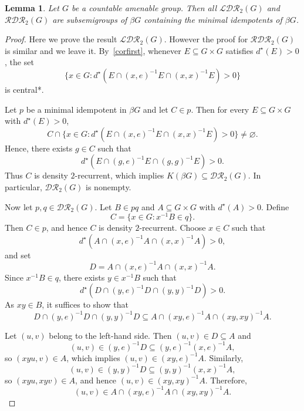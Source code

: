 \documentclass[10pt,a4paper]{amsart}
\newtheorem{lem}{Lemma}
\begin{document}
\begin{lem}\label{subsemigroup}
Let $G$ be a countable amenable group. Then all $ \mathcal{LDR}_2(G)$ and $\mathcal{RDR}_2(G)$ are subsemigroups of $\beta G$ containing the minimal idempotents of $\beta G$.
\end{lem}

\begin{proof} Here we prove the result $\mathcal{LDR}_2(G).$ However the proof for  $\mathcal{RDR}_2(G)$ is similar and we leave it.
By~\ref{corfirst}, whenever
$E \subseteq G \times G$ satisfies $d^\star(E) > 0$, the set
\[
\{ x \in G : d^\star(E \cap (x,e)^{-1}E \cap (x,x)^{-1}E) > 0 \}
\]
is central*.

Let $p$ be a minimal idempotent in $\beta G$ and let $C \in p$. Then for every
$E \subseteq G \times G$ with $d^\star(E) > 0$,
\[
C \cap \{ x \in G : d^\star(E \cap (x,e)^{-1}E \cap (x,x)^{-1}E) > 0 \} \neq \varnothing.
\]
Hence, there exists $g \in C$ such that
\[
d^\star(E \cap (g,e)^{-1}E \cap (g,g)^{-1}E) > 0.
\]
Thus $C$ is density $2$-recurrent, which implies
$K(\beta G) \subseteq \mathcal{DR}_2(G)$. In particular,
$\mathcal{DR}_2(G)$ is nonempty.

Now let $p,q \in \mathcal{DR}_2(G)$. Let $B \in pq$ and
$A \subseteq G \times G$ with $d^\star(A) > 0$. Define
\[
C = \{ x \in G : x^{-1}B \in q \}.
\]
Then $C \in p$, and hence $C$ is density $2$-recurrent. Choose $x \in C$ such that
\[
d^\star(A \cap (x,e)^{-1}A \cap (x,x)^{-1}A) > 0,
\]
and set
\[
D = A \cap (x,e)^{-1}A \cap (x,x)^{-1}A.
\]
Since $x^{-1}B \in q$, there exists $y \in x^{-1}B$ such that
\[
d^\star(D \cap (y,e)^{-1}D \cap (y,y)^{-1}D) > 0.
\]
As $xy \in B$, it suffices to show that
\[
D \cap (y,e)^{-1}D \cap (y,y)^{-1}D
\subseteq
A \cap (xy,e)^{-1}A \cap (xy,xy)^{-1}A.
\]

Let $(u,v)$ belong to the left-hand side. Then $(u,v) \in D \subseteq A$ and
\[
(u,v) \in (y,e)^{-1}D \subseteq (y,e)^{-1}(x,e)^{-1}A,
\]
so $(xyu,v) \in A$, which implies $(u,v) \in (xy,e)^{-1}A$.
Similarly,
\[
(u,v) \in (y,y)^{-1}D \subseteq (y,y)^{-1}(x,x)^{-1}A,
\]
so $(xyu,xyv) \in A$, and hence $(u,v) \in (xy,xy)^{-1}A$.
Therefore,
\[
(u,v) \in A \cap (xy,e)^{-1}A \cap (xy,xy)^{-1}A.
\]
\end{proof}
\end{document}
